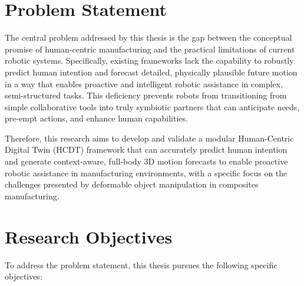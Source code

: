 \section{Problem Statement}
\label{sec:problem_statement}

The central problem addressed by this thesis is the gap between the conceptual promise of human-centric manufacturing and the practical limitations of current robotic systems. Specifically, existing frameworks lack the capability to robustly predict human intention and forecast detailed, physically plausible future motion in a way that enables proactive and intelligent robotic assistance in complex, semi-structured tasks. This deficiency prevents robots from transitioning from simple collaborative tools into truly symbiotic partners that can anticipate needs, pre-empt actions, and enhance human capabilities.

Therefore, this research aims to develop and validate a modular Human-Centric Digital Twin (HCDT) framework that can accurately predict human intention and generate context-aware, full-body 3D motion forecasts to enable proactive robotic assistance in manufacturing environments, with a specific focus on the challenges presented by deformable object manipulation in composites manufacturing.

\section{Research Objectives}
\label{sec:objectives}

To address the problem statement, this thesis pursues the following specific objectives:

